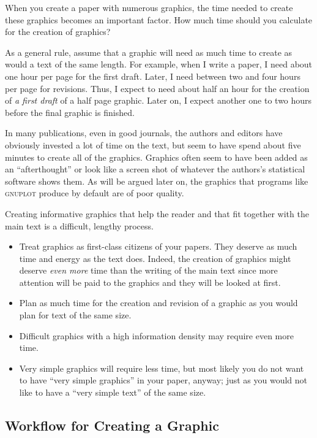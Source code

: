When you create a paper with numerous graphics, the time needed to create these
graphics becomes an important factor. How much time should you calculate for
the creation of graphics?

As a general rule, assume that a graphic will need as much time to create as
would a text of the same length. For example, when I write a paper, I need
about one hour per page for the first draft. Later, I need between two and four
hours per page for revisions. Thus, I expect to need about half an hour for the
creation of \emph{a first draft} of a half page graphic. Later on, I expect
another one to two hours before the final graphic is finished.

In many publications, even in good journals, the authors and editors have
obviously  invested a lot of time on the text, but seem to have spend about
five minutes to create all of the graphics. Graphics often seem to have been
added as an ``afterthought'' or look like a screen shot of whatever the
authors's statistical software shows them. As will be argued later on, the
graphics that programs like \textsc{gnuplot} produce by default are of poor
quality.

Creating informative graphics that help the reader and that fit together with
the main text is a difficult, lengthy process.
%
\begin{itemize}
    \item Treat graphics as first-class citizens of your papers. They deserve
        as much time and energy as the text does. Indeed, the creation of
        graphics might deserve \emph{even more} time than the writing of the
        main text since more attention will be paid to the graphics and they
        will be looked at first.
    \item Plan as much time for the creation and revision of a graphic as you
        would plan for text of the same size.
    \item Difficult graphics with a high information density may require even
        more time.
    \item Very simple graphics will require less time, but most likely you do
        not want to have ``very simple graphics'' in your paper, anyway; just
        as you would not like to have a ``very simple text'' of the same
        size.
\end{itemize}


\subsection{Workflow for Creating a Graphic}

